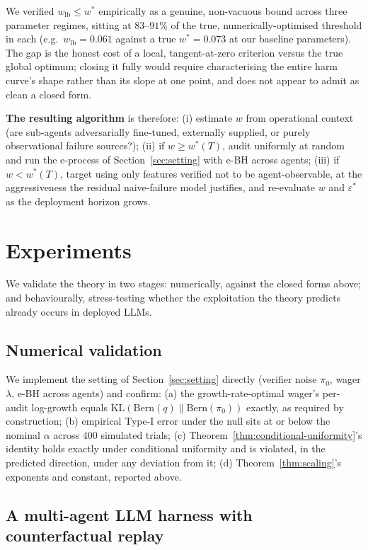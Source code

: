 \documentclass[sigconf,anonymous]{aamas}
\theoremstyle{plain}
\theoremstyle{definition}
\begin{document}
We verified $w_{\mathrm{lb}} \le w^*$ empirically as a genuine, non-vacuous
bound across three parameter regimes, sitting at $83$--$91\%$ of the true,
numerically-optimised threshold in each (e.g.\ $w_{\mathrm{lb}}=0.061$
against a true $w^*=0.073$ at our baseline parameters). The gap is the
honest cost of a local, tangent-at-zero criterion versus the true global
optimum; closing it fully would require characterising the entire harm
curve's shape rather than its slope at one point, and does not appear to
admit as clean a closed form.

\textbf{The resulting algorithm} is therefore: (i) estimate $w$ from
operational context (are sub-agents adversarially fine-tuned, externally
supplied, or purely observational failure sources?); (ii) if $w \ge w^*(T)$,
audit uniformly at random and run the e-process of Section~\ref{sec:setting}
with e-BH across agents; (iii) if $w < w^*(T)$, target using only features
verified not to be agent-observable, at the aggressiveness the residual
naive-failure model justifies, and re-evaluate $w$ and $\varepsilon^*$ as the
deployment horizon grows.

\section{Experiments}
\label{sec:experiments}

We validate the theory in two stages: numerically, against the closed forms
above; and behaviourally, stress-testing whether the exploitation the theory
predicts already occurs in deployed LLMs.

\subsection{Numerical validation}

We implement the setting of Section~\ref{sec:setting} directly (verifier
noise $\pi_0$, wager $\lambda$, e-BH across agents) and confirm: (a) the
growth-rate-optimal wager's per-audit log-growth equals
$\mathrm{KL}(\mathrm{Bern}(q)\|\mathrm{Bern}(\pi_0))$ exactly, as required
by construction; (b) empirical Type-I error under the null sits at or below
the nominal $\alpha$ across 400 simulated trials; (c)
Theorem~\ref{thm:conditional-uniformity}'s identity holds exactly under
conditional uniformity and is violated, in the predicted direction, under
any deviation from it; (d) Theorem~\ref{thm:scaling}'s exponents and
constant, reported above.

\subsection{A multi-agent LLM harness with counterfactual replay}
\end{document}
